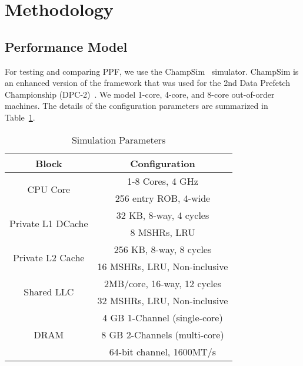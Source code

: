 \section{Methodology}
\label{Method}

\subsection{Performance Model}
\label{Method-Model}
For testing and comparing PPF, we use the ChampSim~\cite{Champsim} simulator.
ChampSim is an enhanced version of the framework that was used for the 2nd
Data Prefetch Championship (DPC-2)~\cite{DPC_2}. We model 1-core, 4-core, and
8-core out-of-order machines. The details of the configuration parameters are
summarized in Table~\ref{tab:Sim_params}.

\begin{table}[]
    \centering
    \begin{adjustbox}{width=0.9\columnwidth}
    \begin{tabular}{|c|c|}
    \hline
    	 Block & Configuration\\
    \hline
	 \multirow{2}{1.5cm}{CPU Core} 		& 1-8 Cores, 4 GHz\\
						& 256 entry ROB, 4-wide\\
    \hline
         \multirow{2}{2.7cm}{Private L1 DCache} & 32 KB, 8-way, 4 cycles\\
						& 8 MSHRs, LRU\\
    \hline
         \multirow{2}{2.4cm}{Private L2 Cache}  & 256 KB, 8-way, 8 cycles\\
						& 16 MSHRs, LRU, Non-inclusive\\		
    \hline
         \multirow{2}{1.7cm}{Shared LLC} 	& 2MB/core, 16-way, 12 cycles\\
						& 32 MSHRs, LRU, Non-inclusive\\
    \hline
         \multirow{3}{1.1cm}{DRAM} 		& 4 GB 1-Channel (single-core)\\ 
						& 8 GB 2-Channels (multi-core)\\ 
						& 64-bit channel, 1600MT/s\\
    \hline
    \end{tabular}
    \end{adjustbox}
    \caption{Simulation Parameters}
    \label{tab:Sim_params}
\end{table}


